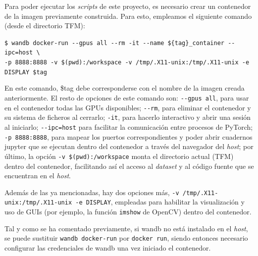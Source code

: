 Para poder ejecutar los \textit{scripts} de este proyecto, es necesario crear un contenedor de la imagen previamente construida. Para esto, empleamos el siguiente comando (desde el directorio TFM):

\texttt{\$ wandb docker{-}run {-}{-}gpus all {-}{-}rm {-}it {-}{-}name \$\{tag\}{\_}container 
{-}{-}ipc=host \textbackslash \\ 
{-}p 8888:8888 {-}v \$(pwd):/workspace {-}v /tmp/.X11{-}unix:/tmp/.X11{-}unix {-}e DISPLAY \$tag}

En este comando, \$tag debe corresponderse con el nombre de la imagen creada anteriormente. El resto de opciones de este comando son: \texttt{{-}{-}gpus all}, para usar en el contenedor todas las GPUs disponibles; \texttt{{-}{-}rm}, para eliminar el contenedor y su sistema de ficheros al cerrarlo; \texttt{{-}it}, para hacerlo interactivo y abrir una sesión al iniciarlo; \texttt{{-}{-}ipc=host} para facilitar la comunicación entre procesos de PyTorch; \texttt{{-}p 8888:8888}, para mapear los puertos correspondientes y poder abrir cuadernos jupyter que se ejecutan dentro del contenedor a través del navegador del \textit{host}; por último, la opción \texttt{{-}v \$(pwd):/workspace} monta el directorio actual (TFM) dentro del contenedor, facilitando así el acceso al \textit{dataset} y al código fuente que se encuentran en el \textit{host}.

Además de las ya mencionadas, hay dos opciones más, \texttt{{-}v /tmp/.X11{-}unix:/tmp/.X11{-}unix {-}e DISPLAY}, empleadas para habilitar la visualización y uso de GUIs (por ejemplo, la función \texttt{imshow} de OpenCV) dentro del contenedor.

Tal y como se ha comentado previamente, si wandb no está instalado en el \textit{host}, se puede sustituir \texttt{wandb docker{-}run} por \texttt{docker run}, siendo entonces necesario configurar las credenciales de wandb una vez iniciado el contenedor. 

